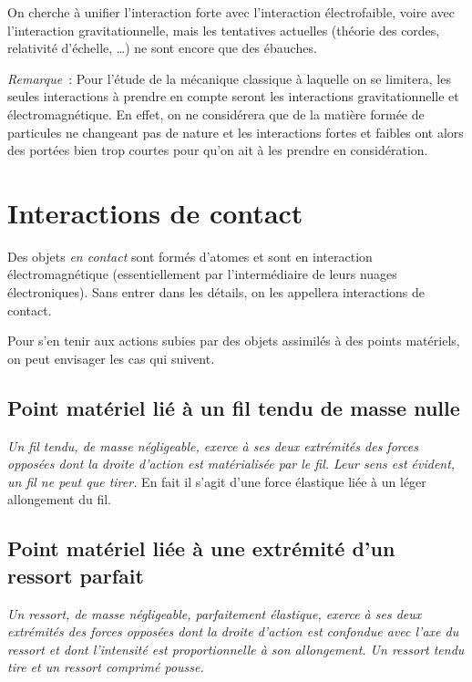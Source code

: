 On cherche à unifier l'interaction forte avec l'interaction électrofaible,
voire avec l'interaction gravitationnelle, mais les tentatives actuelles
(théorie des cordes, relativité d'échelle, \ldots) ne sont encore que des
ébauches.

\emph{Remarque}~: Pour l'étude de la mécanique classique à laquelle on se%
limitera, les seules interactions à prendre en compte seront les interactions
gravitationnelle et électromagnétique. En effet, on ne considérera que de la
matière formée de particules ne changeant pas de nature et les interactions
fortes et faibles ont alors des portées bien trop courtes pour qu'on ait à
les prendre en considération.

\section{Interactions de contact}%
\label{chap2-sec:interactiondecontac}%

Des objets \emph{en contact} sont formés d'atomes et sont en interaction
électromagnétique (essentiellement par l'intermédiaire de leurs nuages
électroniques). Sans entrer dans les détails, on les appellera interactions
de contact.

Pour s'en tenir aux actions subies par des objets assimilés à des points
matériels, on peut envisager les cas qui suivent.

\subsection{Point matériel lié à un fil tendu de masse nulle}%
\label{chap2-subsec:filtendu}%

\emph{Un fil tendu, de masse négligeable, exerce à ses deux extrémités des
forces opposées dont la droite d'action est matérialisée par le fil. Leur
sens est évident, un fil ne peut que tirer.} En fait il s'agit d'une force
élastique liée à un léger allongement du fil.

\subsection{Point matériel liée à une extrémité d'un ressort parfait}%
\label{chap2-subsec:ressort}%

\emph{Un ressort, de masse négligeable, parfaitement élastique, exerce à ses
deux extrémités des forces opposées dont la droite d'action est confondue
avec l'axe du ressort et dont l'intensité est proportionnelle à son
allongement. Un ressort tendu tire et un ressort comprimé pousse.}

